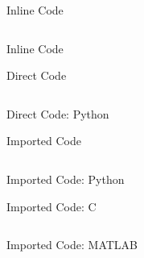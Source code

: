\begin{frame}[fragile]{Inline Code}
    \begin{listing}
        \inputminted[fontsize=\footnotesize]{latex}{assets/tex/code/inline.tex}
        \caption{Inline code with \texttt{\textbackslash mintinline}}
    \end{listing}
\end{frame}

\begin{frame}{Inline Code}
    
\end{frame}

\begin{frame}[fragile]{Direct Code}
    \begin{listing}
        \inputminted[fontsize=\footnotesize]{latex}{assets/tex/code/direct.tex}
        \caption{Using a \texttt{minted} environment with \texttt{highlightlines}}
    \end{listing}
\end{frame}

\begin{frame}[fragile]{Direct Code: Python}
    
\end{frame}

\begin{frame}[fragile]{Imported Code}
    \begin{listing}
        \inputminted{latex}{assets/tex/code/imported.tex}
        \caption{Importing a source file with listing and caption}
    \end{listing}
\end{frame}

\begin{frame}[fragile]{Imported Code: Python}
    
\end{frame}

\begin{frame}[fragile]{Imported Code: C}
    \begin{listing}
        \inputminted[fontsize=\footnotesize]{c}{assets/listings/fibonacci.c}
        \caption{Recursive Fibonacci in C}
    \end{listing}
\end{frame}

\begin{frame}[fragile]{Imported Code: MATLAB}
    \begin{listing}
        \inputminted[fontsize=\scriptsize]{matlab}{assets/listings/filter.m}
        \caption{Butterworth low-pass filter design}
    \end{listing}
\end{frame}

